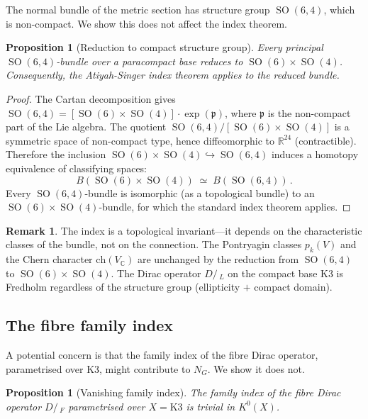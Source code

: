 \documentclass[12pt,a4paper]{article}
\newtheorem{proposition}[theorem]{Proposition}
\theoremstyle{definition}
\newtheorem{remark}[theorem]{Remark}
\newcommand{\SO}{\operatorname{SO}}
\newcommand{\R}{\mathbb{R}}
\newcommand{\C}{\mathbb{C}}
\begin{document}
The normal bundle of the metric section has structure group $\SO(6,4)$, which is non-compact.
We show this does not affect the index theorem.

\begin{proposition}[Reduction to compact structure group]
\label{prop:reduction}
Every principal $\SO(6,4)$-bundle over a paracompact base reduces to $\SO(6) \times \SO(4)$.
Consequently, the Atiyah-Singer index theorem applies to the reduced bundle.
\end{proposition}

\begin{proof}
The Cartan decomposition gives $\SO(6,4) = [\SO(6) \times \SO(4)] \cdot \exp(\mathfrak{p})$, where $\mathfrak{p}$ is the non-compact part of the Lie algebra.
The quotient $\SO(6,4)/[\SO(6) \times \SO(4)]$ is a symmetric space of non-compact type, hence diffeomorphic to $\R^{24}$ (contractible).
Therefore the inclusion $\SO(6) \times \SO(4) \hookrightarrow \SO(6,4)$ induces a homotopy equivalence of classifying spaces:
\begin{equation}
B\!\left(\SO(6) \times \SO(4)\right) \;\simeq\; B\!\left(\SO(6,4)\right)\,.
\end{equation}
Every $\SO(6,4)$-bundle is isomorphic (as a topological bundle) to an $\SO(6) \times \SO(4)$-bundle, for which the standard index theorem applies.
\end{proof}

\begin{remark}
The index is a topological invariant---it depends on the characteristic classes of the bundle, not on the connection.
The Pontryagin classes $p_k(V)$ and the Chern character $\mathrm{ch}(V_\C)$ are unchanged by the reduction from $\SO(6,4)$ to $\SO(6) \times \SO(4)$.
The Dirac operator $D\!\!\!\!/\,_L$ on the compact base K3 is Fredholm regardless of the structure group (ellipticity $+$ compact domain).
\end{remark}

\subsection{The fibre family index}
\label{sec:family}

A potential concern is that the family index of the fibre Dirac operator, parametrised over K3, might contribute to $N_G$.
We show it does not.

\begin{proposition}[Vanishing family index]
\label{prop:family}
The family index of the fibre Dirac operator $D\!\!\!\!/\,_F$ parametrised over $X = \mathrm{K3}$ is trivial in $K^0(X)$.
\end{proposition}
\end{document}
